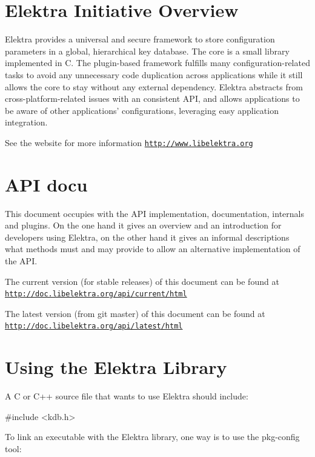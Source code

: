 \hypertarget{index_overview}{}\section{Elektra Initiative Overview}\label{index_overview}
Elektra provides a universal and secure framework to store configuration parameters in a global, hierarchical key database. The core is a small library implemented in C. The plugin-\/based framework fulfills many configuration-\/related tasks to avoid any unnecessary code duplication across applications while it still allows the core to stay without any external dependency. Elektra abstracts from cross-\/platform-\/related issues with an consistent A\+P\+I, and allows applications to be aware of other applications' configurations, leveraging easy application integration.

See the website for more information \href{http://www.libelektra.org}{\tt http\+://www.\+libelektra.\+org}\hypertarget{index_focus}{}\section{A\+P\+I docu}\label{index_focus}
This document occupies with the A\+P\+I implementation, documentation, internals and plugins. On the one hand it gives an overview and an introduction for developers using Elektra, on the other hand it gives an informal descriptions what methods must and may provide to allow an alternative implementation of the A\+P\+I.

The current version (for stable releases) of this document can be found at \href{http://doc.libelektra.org/api/current/html}{\tt http\+://doc.\+libelektra.\+org/api/current/html}

The latest version (from git master) of this document can be found at \href{http://doc.libelektra.org/api/latest/html}{\tt http\+://doc.\+libelektra.\+org/api/latest/html}\hypertarget{index_using}{}\section{Using the Elektra Library}\label{index_using}
A C or C++ source file that wants to use Elektra should include\+: 
\begin{DoxyCode}
\textcolor{preprocessor}{#include <kdb.h>}
\end{DoxyCode}


To link an executable with the Elektra library, one way is to use the {\ttfamily pkg-\/config} tool\+: 


